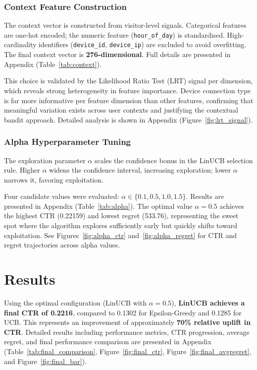 \documentclass[12pt]{article}
\begin{document}
\subsubsection{Context Feature Construction}

The context vector is constructed from visitor-level signals. Categorical features are one-hot encoded; the numeric feature (\texttt{hour\_of\_day}) is standardised. High-cardinality identifiers (\texttt{device\_id}, \texttt{device\_ip}) are excluded to avoid overfitting. The final context vector is \textbf{276-dimensional}. Full details are presented in Appendix (Table~\ref{tab:context}).

This choice is validated by the Likelihood Ratio Test (LRT) signal per dimension, which reveals strong heterogeneity in feature importance. Device connection type is far more informative per feature dimension than other features, confirming that meaningful variation exists across user contexts and justifying the contextual bandit approach. Detailed analysis is shown in Appendix (Figure~\ref{fig:lrt_signal}).

\subsubsection{Alpha Hyperparameter Tuning}

The exploration parameter $\alpha$ scales the confidence bonus in the LinUCB selection rule. Higher $\alpha$ widens the confidence interval, increasing exploration; lower $\alpha$ narrows it, favoring exploitation.

Four candidate values were evaluated: $\alpha \in \{0.1, 0.5, 1.0, 1.5\}$. Results are presented in Appendix (Table~\ref{tab:alpha}). The optimal value $\alpha = 0.5$ achieves the highest CTR (0.22159) and lowest regret (533.76), representing the sweet spot where the algorithm explores sufficiently early but quickly shifts toward exploitation. See Figures~\ref{fig:alpha_ctr} and~\ref{fig:alpha_regret} for CTR and regret trajectories across alpha values.

\section{Results}

Using the optimal configuration (LinUCB with $\alpha = 0.5$), \textbf{LinUCB achieves a final CTR of 0.2216}, compared to 0.1302 for Epsilon-Greedy and 0.1285 for UCB. This represents an improvement of approximately \textbf{70\% relative uplift in CTR}. Detailed results including performance metrics, CTR progression, average regret, and final performance comparison are presented in Appendix (Table~\ref{tab:final_comparison}, Figure~\ref{fig:final_ctr}, Figure~\ref{fig:final_avgregret}, and Figure~\ref{fig:final_bar}).
\end{document}

